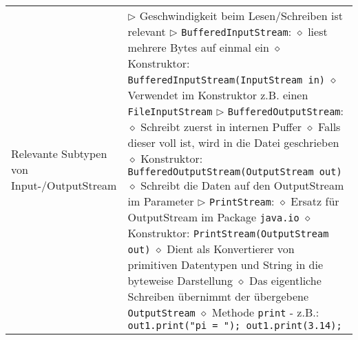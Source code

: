 \begin{longtable}{ | p{} p{} | }
	\makecell[l]{Relevante Subtypen  von \\Input-/OutputStream} & \makecell[l]{
	$\triangleright$ Geschwindigkeit beim Lesen/Schreiben ist relevant \\
	$\triangleright$ \texttt{BufferedInputStream}: \\
	\hspace{0.4cm} $\diamond$ liest mehrere Bytes auf einmal ein \\
	\hspace{0.4cm} $\diamond$ Konstruktor: \texttt{BufferedInputStream(InputStream in)} \\
	\hspace{0.4cm} $\diamond$ Verwendet im Konstruktor z.B. einen \texttt{FileInputStream} \\
	$\triangleright$ \texttt{BufferedOutputStream}: \\
	\hspace{0.4cm} $\diamond$ Schreibt zuerst in internen Puffer \\
	\hspace{0.4cm} $\diamond$ Falls dieser voll ist, wird in die Datei geschrieben \\
	\hspace{0.4cm} $\diamond$ Konstruktor: \texttt{BufferedOutputStream(OutputStream out)} \\
	\hspace{0.4cm} $\diamond$ Schreibt die Daten auf den OutputStream im Parameter \\
	$\triangleright$ \texttt{PrintStream}: \\
	\hspace{0.4cm} $\diamond$ Ersatz für OutputStream im Package \texttt{java.io} \\
	\hspace{0.4cm} $\diamond$ Konstruktor: \texttt{PrintStream(OutputStream out)} \\
	\hspace{0.4cm} $\diamond$ Dient als Konvertierer von primitiven Datentypen und String \\
	\hspace{0.8cm} in die byteweise Darstellung \\
	\hspace{0.4cm} $\diamond$ Das eigentliche Schreiben übernimmt der übergebene \texttt{OutputStream} \\
	\hspace{0.4cm} $\diamond$ Methode \texttt{print} \\ 
	\hspace{0.6cm} - z.B.: \texttt{out1.print("pi = "); out1.print(3.14);} \\
}
\end{longtable}
